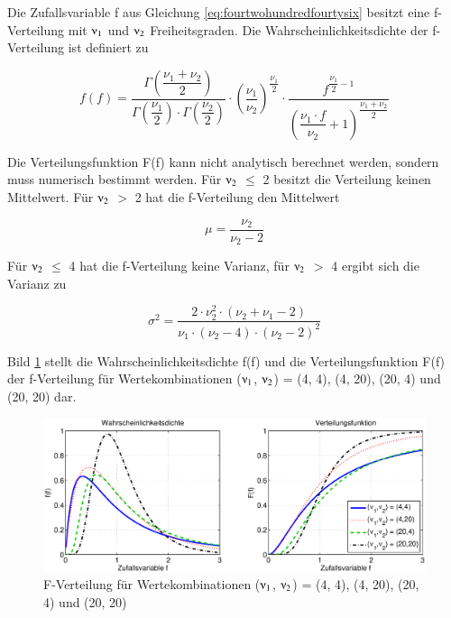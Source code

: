 \noindent Die Zufallsvariable f aus Gleichung \eqref{eq:fourtwohundredfourtysix} besitzt eine f-Verteilung mit $\nuup_{1}$ und $\nuup_{2}$ Freiheitsgraden. Die Wahrscheinlichkeitsdichte der f-Verteilung ist definiert zu

\begin{equation}\label{eq:fourtwohundredfourtyseven}
f(f)=\dfrac{\Gamma \left(\dfrac{\nu _{1} +\nu _{2} }{2} \right)}{\Gamma \left(\dfrac{\nu _{1} }{2} \right)\cdot \Gamma \left(\dfrac{\nu _{2} }{2} \right)} \cdot \left(\dfrac{\nu _{1} }{\nu _{2} } \right)^{\dfrac{\nu _{1} }{2}} \cdot \dfrac{f^{\dfrac{\nu _{1} }{2} -1}}{\left(\dfrac{\nu _{1} \cdot f}{\nu _{2}} +1\right)^{\dfrac{\nu _{1} +\nu _{2}}{2}}}
\end{equation}

\noindent Die Verteilungsfunktion F(f) kann nicht analytisch berechnet werden, sondern muss numerisch bestimmt werden. F\"{u}r $\nuup_{2}$ $\mathrm{\le}$ 2 besitzt die Verteilung keinen Mittelwert. F\"{u}r $\nuup_{2}$ $\mathrm{>}$ 2 hat die f-Verteilung den Mittelwert

\begin{equation}\label{eq:fourtwohundredfourtyeight}
\mu =\dfrac{\nu _{2} }{\nu _{2} -2}
\end{equation}

\noindent F\"{u}r $\nuup_{2}$ $\leq$ 4 hat die f-Verteilung keine Varianz, f\"{u}r $\nuup_{2}$ $\mathrm{>}$ 4 ergibt sich die Varianz zu

\begin{equation}\label{eq:fourtwohundredfourtynine}
\sigma ^{2} =\dfrac{2\cdot \nu _{2}^{2} \cdot \left(\nu _{2} +\nu _{1} -2\right)}{\nu _{1} \cdot \left(\nu _{2} -4\right)\cdot \left(\nu _{2} -2\right)^{2} }
\end{equation}

\noindent Bild \ref{fig:Testverteilungen_Fisher} stellt die Wahrscheinlichkeitsdichte f(f) und die Verteilungsfunktion F(f) der f-Verteilung f\"{u}r Wertekombinationen ($\nuup_{1}$, $\nuup_{2}$) = (4, 4), (4, 20), (20, 4) und (20, 20) dar.

\begin{figure}[H]
  \centerline{\includegraphics[width=1\textwidth]{Kapitel4/Bilder/image46}}
  \caption{F-Verteilung f\"{u}r Wertekombinationen ($\nuup_{1}$, $\nuup_{2}$) = (4, 4), (4, 20), (20, 4) und (20, 20)}
  \label{fig:Testverteilungen_Fisher}
\end{figure}

